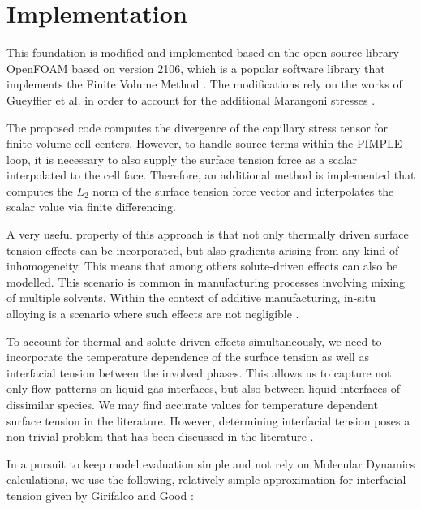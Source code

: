 \documentclass[conference,final]{IEEEtran}
\begin{document}

\section{Implementation}

This foundation is modified and implemented based on the open source library OpenFOAM based on version 2106, which is a popular software library that implements the Finite Volume Method \cite{jasakOpenFOAMLibraryComplex2007}. The modifications rely on the works of Gueyffier et al. in order to account for the additional Marangoni stresses \cite{gueyffierVolumeofFluidInterfaceTracking1999}.

The proposed code computes the divergence of the capillary stress tensor for finite volume cell centers. However, to handle source terms within the PIMPLE loop, it is necessary to also supply the surface tension force as a scalar interpolated to the cell face. Therefore, an additional method is implemented that computes the $L_2$ norm of the surface tension force vector and interpolates the scalar value via finite differencing.

A very useful property of this approach is that not only thermally driven surface tension effects can be incorporated, but also gradients arising from any kind of inhomogeneity. This means that among others solute-driven effects can also be modelled. This scenario is common in manufacturing processes involving mixing of multiple solvents. Within the context of additive manufacturing, in-situ alloying is a scenario where such effects are not negligible \cite{katz-demyanetzInsituAlloyingNovel2020}.

To account for thermal and solute-driven effects simultaneously, we need to incorporate the temperature dependence of the surface tension as well as interfacial tension between the involved phases. This allows us to capture not only flow patterns on liquid-gas interfaces, but also between liquid interfaces of dissimilar species. We may find accurate values for temperature dependent surface tension in the literature. However, determining interfacial tension poses a non-trivial problem that has been discussed in the literature \cite{marmurCorrelatingInterfacialTensions2010}.

In a pursuit to keep model evaluation simple and not rely on Molecular Dynamics calculations, we use the following, relatively simple approximation for interfacial tension given by Girifalco and Good \cite{girifalcoTheoryEstimationSurface1957}:
\end{document}
